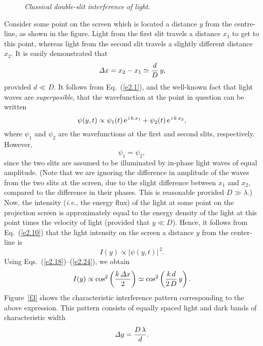 \begin{figure}
\epsfysize=3in
\centerline{}
\caption{\em Classical double-slit interference of light.}\label{f2}   
\end{figure}

Consider some point
on the screen which is located a distance $y$ from the centre-line, as shown in the figure.
Light from the first slit travels a distance $x_1$ to get to this point, whereas
light from the second slit travels a slightly different distance $x_2$. It is
easily demonstrated that
\begin{equation}\label{e2.18}
{\mit\Delta} x = x_2-x_1 \simeq \frac{d}{D}\,y,
\end{equation}
provided $d\ll D$. 
It follows from Eq.~(\ref{e2.1}), and the well-known fact that light waves are {\em superposible}, that the wavefunction  at the point in
question can be written
\begin{equation}\label{e2.19}
\psi(y,t) \propto \psi_1(t)\,{\rm e}^{\,{\rm i}\,k\,x_1} + \psi_2(t)\,{\rm e}^{\,{\rm i}\,k\,x_2},
\end{equation}
where $\psi_1$ and $\psi_2$ are the wavefunctions at the first and
second slits, respectively. 
 However, 
 \begin{equation}\label{e2.19a}
 \psi_1=\psi_2, 
 \end{equation}
 since the two slits are assumed to be
illuminated by in-phase light waves of equal amplitude. (Note that we are ignoring the difference in amplitude
of the waves from the two slits at the screen, due to the slight difference between $x_1$ and $x_2$,  compared to the difference in their phases.
This is reasonable provided $D\gg \lambda$.) Now, the intensity ({\em i.e.}, the energy flux) of the
light at some point on the projection screen is approximately equal to the energy density of the light at this point times the velocity of light (provided that $y\ll D$). Hence, it follows from Eq.~(\ref{e2.10})
that the light intensity on the screen a distance $y$ from the center-line is
\begin{equation}\label{e2.24}
I(y) \propto |\psi(y,t)|^{\,2}.
\end{equation}
Using  Eqs.~(\ref{e2.18})--(\ref{e2.24}), we obtain
\begin{equation}\label{e2.21}
I(y) \propto \cos^2\left(\frac{k\,{\mit\Delta} x}{2}\right) \simeq \cos^2\left(
\frac{k\,d}{2\,D}\,y\right).
\end{equation}
Figure~\ref{f3} shows the  characteristic interference pattern corresponding to the above expression. This pattern consists of equally spaced light and dark bands
of characteristic width
\begin{equation}\label{e2.22}
{\mit\Delta}y = \frac{D\,\lambda}{d}.
\end{equation}

